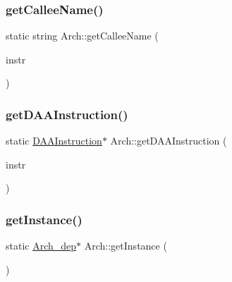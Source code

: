 \mbox{\label{classArch_aa12bd08c634af2d42ea31a51461608eb}} 
\subsubsection{\texorpdfstring{get\+Callee\+Name()}{getCalleeName()}}
{\footnotesize\ttfamily static string Arch\+::get\+Callee\+Name (\begin{DoxyParamCaption}\item[{const \hyperlink{classObjdumpInstruction}{Objdump\+Instruction} \&}]{instr }\end{DoxyParamCaption})\hspace{0.3cm}{\ttfamily [static]}}

\mbox{\label{classArch_a056d89310ba797b493afff641bcc15c6}} 
\subsubsection{\texorpdfstring{get\+D\+A\+A\+Instruction()}{getDAAInstruction()}}
{\footnotesize\ttfamily static \hyperlink{classDAAInstruction}{D\+A\+A\+Instruction}$\ast$ Arch\+::get\+D\+A\+A\+Instruction (\begin{DoxyParamCaption}\item[{const string \&}]{instr }\end{DoxyParamCaption})\hspace{0.3cm}{\ttfamily [static]}}

\mbox{\label{classArch_a384595c0b0c27547c494ce68ea30390d}} 
\subsubsection{\texorpdfstring{get\+Instance()}{getInstance()}}
{\footnotesize\ttfamily static \hyperlink{classArch__dep}{Arch\+\_\+dep}$\ast$ Arch\+::get\+Instance (\begin{DoxyParamCaption}{ }\end{DoxyParamCaption})\hspace{0.3cm}{\ttfamily [static]}}

